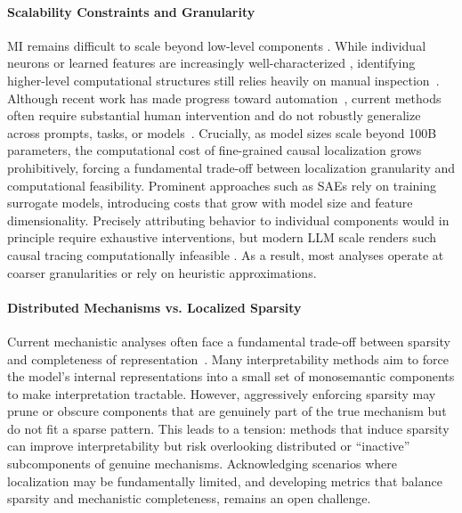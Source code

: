 \documentclass[11pt,letterpaper]{mystyle}
\begin{document}
\paragraph{Scalability Constraints and Granularity} MI remains difficult to scale beyond low-level components \citep{kharlapenko2025scaling,nikankin2025same}. While individual neurons or learned features are increasingly well-characterized \citep{duan2025unveiling, bricken2023monosemanticity}, identifying higher-level computational structures still relies heavily on manual inspection~\citep{he2024dictionary,Markscircuts_iclr2025,yao2024circuits,lindsey2025biology,nguyen2025challenges}. Although recent work has made progress toward automation~\citep{conmy2023automated,hanna2024have}, current methods often require substantial human intervention and do not robustly generalize across prompts, tasks, or models~\citep{prakash2024fine,hanna-etal-2025-circuit,li2025find}. Crucially, as model sizes scale beyond 100B parameters, the computational cost of fine-grained causal localization grows prohibitively, forcing a fundamental trade-off between localization granularity and computational feasibility. Prominent approaches such as SAEs rely on training surrogate models, introducing costs that grow with model size and feature dimensionality. Precisely attributing behavior to individual components would in principle require exhaustive interventions, but modern LLM scale renders such causal tracing computationally infeasible \citep{zhang2023towards,hanna2024have}. As a result, most analyses \citep{nanda2023attribution,syedetal2024attribution,yumaagnitude_emnlp2024,ameisen2025circuit} operate at coarser granularities or rely on heuristic approximations.

\paragraph{Distributed Mechanisms vs. Localized Sparsity} 
Current mechanistic analyses often face a fundamental trade-off between sparsity and completeness of representation~\citep{gao2025weight,pach2025sparse}. 
Many interpretability methods aim to force the model's internal representations into a small set of monosemantic components to make interpretation tractable. However, aggressively enforcing sparsity may prune or obscure components that are genuinely part of the true mechanism but do not fit a sparse pattern. This leads to a tension: methods that induce sparsity can improve interpretability but risk overlooking distributed or ``inactive'' subcomponents of genuine mechanisms. Acknowledging scenarios where localization may be fundamentally limited, and developing metrics that balance sparsity and mechanistic completeness, remains an open challenge.
\end{document}
